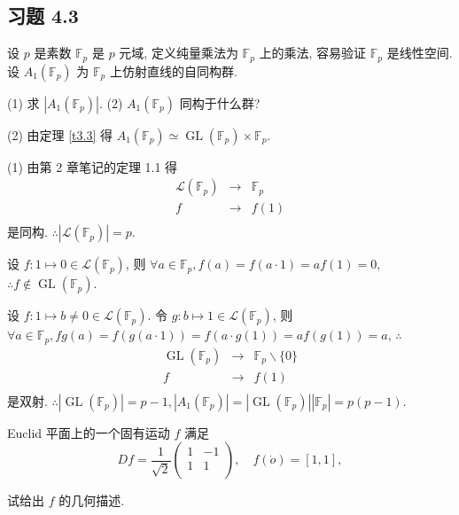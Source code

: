 \documentclass{ctexart}
\begin{document}
\subsection{习题 4.3}
    
\begin{exercise}[3.1]
    设 $p$ 是素数 $\mathbb{F}_p$ 是 $p$ 元域, 定义纯量乘法为 $\mathbb{F}_p$ 上的乘法, 容易验证 $\mathbb{F}_p$ 是线性空间. 设 $A_1(\mathbb{F}_p)$ 为 $\mathbb{F}_p$ 上仿射直线的自同构群.

    (1) 求 $|A_1(\mathbb{F}_p)|$. (2) $A_1(\mathbb{F}_p)$ 同构于什么群?
\end{exercise}
\begin{solution}
    (2) 由定理 \ref{t3.3} 得 $A_1(\mathbb{F}_p)\simeq\operatorname{GL}(\mathbb{F}_p)\times\mathbb{F}_p$.

    (1) 由第 2 章笔记的定理 1.1 得
    \[\begin{array}{rcl}
        \mathcal{L}(\mathbb{F}_p) & \to & \mathbb{F}_p \\
        f & \to & f(1) \\
    \end{array}\]
    是同构. $\therefore|\mathcal{L}(\mathbb{F}_p)|=p$.

    设 $f:1\mapsto0\in\mathcal{L}(\mathbb{F}_p)$, 则 $\forall a\in\mathbb{F}_p,f(a)=f(a\cdot 1)=af(1)=0$, $\therefore f\notin\operatorname{GL}(\mathbb{F}_p)$.

    设 $f:1\mapsto b\neq0\in\mathcal{L}(\mathbb{F}_p)$. 令 $g:b\mapsto 1\in\mathcal{L}(\mathbb{F}_p)$, 则 $\forall a\in\mathbb{F}_p,fg(a)=f(g(a\cdot 1))=f(a\cdot g(1))=af(g(1))=a$, $\therefore$
    \[\begin{array}{rcl}
        \operatorname{GL}(\mathbb{F}_p) & \to & \mathbb{F}_p\backslash\{0\} \\
        f & \to & f(1) \\
    \end{array}\]
    是双射. $\therefore|\operatorname{GL}(\mathbb{F}_p)|=p-1,|A_1(\mathbb{F}_p)|=|\operatorname{GL}(\mathbb{F}_p)||\mathbb{F}_p|=p(p-1)$.
\end{solution}
\begin{exercise}[3.2]
    Euclid 平面上的一个固有运动 $f$ 满足
    \[Df=\dfrac{1}{\sqrt{2}}\begin{pmatrix}
        1 & -1 \\
        1 & 1 \\
    \end{pmatrix},\quad f(\dot{o})=[1,1],\]

    试给出 $f$ 的几何描述.
\end{exercise}
\end{document}
